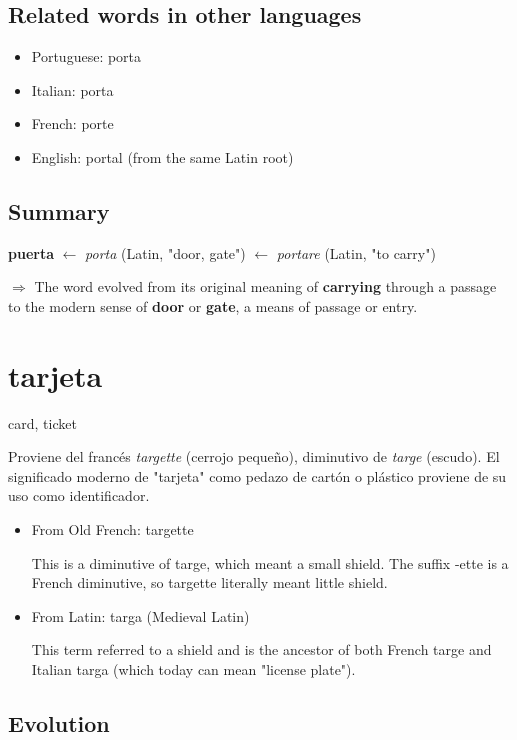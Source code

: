 \documentclass[10pt]{book}
\newcommand{\wordentry}[2]{
	\large #1
	\vspace{-0.5em}
	\begin{etymologybox}
		#2
	\end{etymologybox}
}
\let\oldsection\section
\renewcommand{\section}[1]{
	\needspace{8\baselineskip}
	\oldsection{#1}
}
\begin{document}
	\subsection*{Related words in other languages}
	\begin{itemize}
		\item Portuguese: porta
		\item Italian: porta
		\item French: porte
		\item English: portal (from the same Latin root)
	\end{itemize}
	
	\subsection*{Summary}
	\textbf{puerta} $\leftarrow$ \textit{porta} (Latin, "door, gate") $\leftarrow$ \textit{portare} (Latin, "to carry")
	
	$\Rightarrow$ The word evolved from its original meaning of \textbf{carrying} through a passage to the modern sense of \textbf{door} or \textbf{gate}, a means of passage or entry.
	
	\section{tarjeta}
	\wordentry{card, ticket}{
	Proviene del francés \textit{targette} (cerrojo pequeño), diminutivo de \textit{targe} (escudo). El significado moderno de "tarjeta" como pedazo de cartón o plástico proviene de su uso como identificador.
	\begin{itemize}
		\item From Old French: targette
		
		This is a diminutive of targe, which meant a small shield. The suffix -ette is a French diminutive, so targette literally meant little shield.
		
		\item From Latin: targa (Medieval Latin)
		
		This term referred to a shield and is the ancestor of both French targe and Italian targa (which today can mean "license plate").
	\end{itemize}
	}
	
	\subsection*{Evolution}
	
\end{document}

